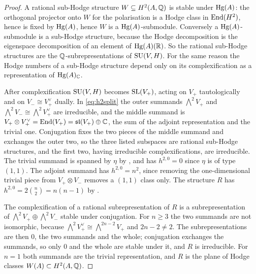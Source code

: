\begin{proof}
A rational sub-Hodge structure $W\subseteq H^{2}(A,\mathbb{Q})$ is stable under
$\operatorname{Hg}(A)$: the orthogonal projector onto $W$ for the polarisation is a Hodge
class in $\operatorname{End}(H^{2})$, hence is fixed by $\operatorname{Hg}(A)$, hence $W$ is a
$\operatorname{Hg}(A)$-submodule. Conversely a $\operatorname{Hg}(A)$-submodule is a sub-Hodge structure,
because the Hodge decomposition is the eigenspace decomposition of an element
of $\operatorname{Hg}(A)(\mathbb{R})$. So the rational sub-Hodge structures are the
$\mathbb{Q}$-subrepresentations of $\operatorname{SU}(V,H)$. For the same reason the Hodge numbers
of a sub-Hodge structure depend only on its complexification as a
representation of $\operatorname{Hg}(A)_{\mathbb{C}}$.

After complexification $\operatorname{SU}(V,H)$ becomes $\operatorname{SL}(V_{+})$, acting on $V_{+}$
tautologically and on $V_{-}\cong V_{+}^{\vee}$ dually. In \eqref{eq:h2split}
the outer summands $\bigwedge^{2}V_{+}$ and
$\bigwedge^{2}V_{-}\cong\bigwedge^{2}V_{+}^{\vee}$ are irreducible, and the
middle summand is $V_{+}\otimes V_{+}^{\vee}=\operatorname{End}(V_{+})
=\mathfrak{sl}(V_{+})\oplus\mathbb{C}$, the sum of the adjoint representation and the
trivial one. Conjugation fixes the two pieces of the middle summand and
exchanges the outer two, so the three listed subspaces are rational sub-Hodge
structures, and the first two, having irreducible complexifications, are
irreducible. The trivial summand is spanned by $\eta$ by ,
and has $h^{2,0}=0$ since $\eta$ is of type $(1,1)$. The adjoint summand has
$h^{2,0}=n^{2}$, since removing the one-dimensional trivial piece from
$V_{+}\otimes V_{-}$ removes a $(1,1)$ class only. The structure $R$ has
$h^{2,0}=2\binom{n}{2}=n(n-1)$ by .

The complexification of a rational subrepresentation of $R$ is a
subrepresentation of $\bigwedge^{2}V_{+}\oplus\bigwedge^{2}V_{-}$ stable under
conjugation. For $n\ge3$ the two summands are not isomorphic, because
$\bigwedge^{2}V_{+}^{\vee}\cong\bigwedge^{2n-2}V_{+}$ and $2n-2\ne2$. The
subrepresentations are then $0$, the two summands and the whole; conjugation
exchanges the summands, so only $0$ and the whole are stable under it, and
$R$ is irreducible.
For $n=1$ both summands are the trivial representation, and $R$ is the plane
of Hodge classes $W(A)\subset H^{2}(A,\mathbb{Q})$.


\end{proof}
